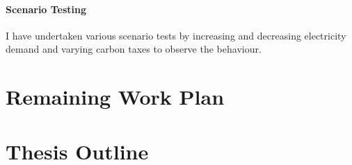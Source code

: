 \documentclass[12pt]{article}
\begin{document}
\paragraph{Scenario Testing}

I have undertaken various scenario tests by increasing and decreasing electricity demand and varying carbon taxes to observe the behaviour.







\clearpage

\section{Remaining Work Plan}








\clearpage

\section{Thesis Outline}
\end{document}
